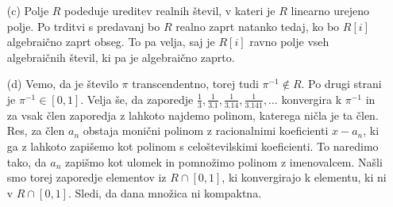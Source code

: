 \documentclass[a4paper, 12pt]{article}
\begin{document}
\begin{enumerate}
\item[(c)] Polje $R$ podeduje ureditev realnih števil, v kateri je $R$ linearno urejeno polje. Po trditvi s predavanj bo $R$ realno zaprt  natanko tedaj, ko bo $R[i]$ algebraično zaprt obseg. To pa velja, saj je $R[i]$ ravno polje vseh algebraičnih števil, ki pa je algebraično zaprto.
\item[(d)] Vemo, da je število $\pi$ transcendentno, torej tudi $\pi^{-1} \notin R$. Po drugi strani je $\pi^{-1} \in [0,1]$. Velja še, da zaporedje $\frac{1}{3}, \frac{1}{3.1}, \frac{1}{3.14}, \frac{1}{3.141},\dots$ konvergira k $\pi^{-1}$ in za vsak člen zaporedja z lahkoto najdemo polinom, katerega ničla je ta člen. Res, za člen $a_n$ obstaja monični polinom z racionalnimi koeficienti $x-a_n$, ki ga z lahkoto zapišemo kot polinom s celoštevilskimi koeficienti. To naredimo tako, da $a_n$ zapišmo kot ulomek in pomnožimo polinom z imenovalcem. Našli smo torej zaporedje elementov iz $R\cap[0,1]$, ki konvergirajo k elementu, ki ni v $R\cap[0,1]$. Sledi, da dana množica ni kompaktna.
\end{enumerate}
\end{document}
